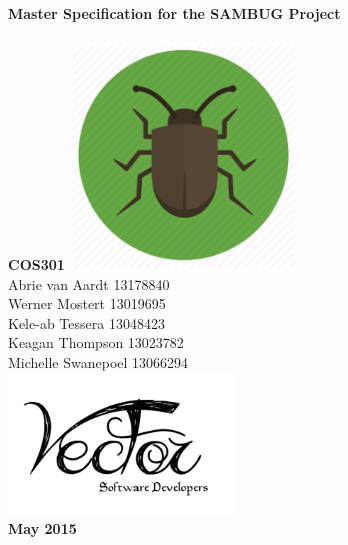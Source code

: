 \documentclass[11pt,a4paper,titlepage]{article}
\begin{document}

\begin{titlepage}
    \centering
    \vfill
    {\bfseries\Huge
        Master Specification for the SAMBUG Project\\
      \hfill\\
         \Large COS301
        \vskip2cm
        \includegraphics[width=6cm]{sambug} \\

    }    
    \vfill
        Abrie van Aardt 13178840\\
		Werner Mostert 13019695\\
		Kele-ab Tessera 13048423\\
		Keagan Thompson 13023782\\
		Michelle Swanepoel 13066294\\
    
    
    \vfill
    \includegraphics[width=6cm]{logo} \\
    \textbf{May 2015}
    \vfill
\end{titlepage}
	
    
\end{document}
